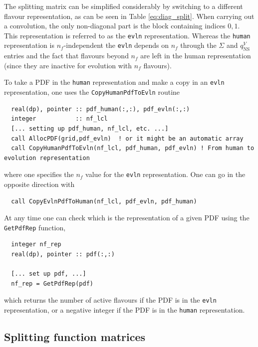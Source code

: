\documentclass[12pt]{article}
\newcommand{\comment}[1]{\textbf{[#1]}}
\newcommand{\ttt}[1]{\texttt{#1}}
\begin{document}
The splitting matrix can be simplified considerably by switching to a different
flavour representation, as can be seen in Table \ref{eq:diag_split}. 
 When carrying out a convolution, the only non-diagonal part is the
block containing indices $0,1$. This representation is referred to as
the \ttt{evln} representation. Whereas the \ttt{human} representation
is $n_f$-independent the \ttt{evln} depends on $n_f$ through the
$\Sigma$ and $q_{\mathrm{NS}}^{V}$ entries and the fact that flavours
beyond $n_f$ are left in the human representation (since they are
inactive for evolution with $n_f$ flavours).

To take a PDF in the \ttt{human} representation and make a copy in an
\ttt{evln} representation, one uses the \ttt{CopyHumanPdfToEvln} routine
\begin{lstlisting}
  real(dp), pointer :: pdf_human(:,:), pdf_evln(:,:)
  integer           :: nf_lcl
  [... setting up pdf_human, nf_lcl, etc. ...] 
  call AllocPDF(grid,pdf_evln)  ! or it might be an automatic array
  call CopyHumanPdfToEvln(nf_lcl, pdf_human, pdf_evln) ! From human to evolution representation
\end{lstlisting}
where one specifies the $n_f$ value for the \ttt{evln} representation.
One can go in the opposite direction with
\begin{lstlisting}
  call CopyEvlnPdfToHuman(nf_lcl, pdf_evln, pdf_human)
\end{lstlisting}
At any time one can check which is the representation of a given
PDF using the \ttt{GetPdfRep} function,
\begin{lstlisting}
  integer nf_rep
  real(dp), pointer :: pdf(:,:)

  [... set up pdf, ...]
  nf_rep = GetPdfRep(pdf)
\end{lstlisting}
which returns the number of active flavours if the PDF is in the
\ttt{evln} representation, or a negative integer if 
the PDF is in the
\ttt{human} representation.


\subsection{Splitting function matrices}
\label{sec:splitt-funct-matr}
\end{document}
